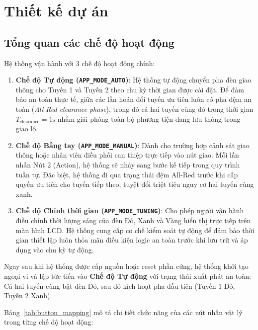 \section{Thiết kế dự án}

\subsection{Tổng quan các chế độ hoạt động}
Hệ thống vận hành với 3 chế độ hoạt động chính:
\begin{enumerate}
    \item \textbf{Chế độ Tự động (\texttt{APP\_MODE\_AUTO})}: Hệ thống tự động chuyển pha đèn giao thông cho Tuyến 1 và Tuyến 2 theo chu kỳ thời gian được cài đặt. Để đảm bảo an toàn thực tế, giữa các lần hoán đổi tuyến ưu tiên luôn có pha đệm an toàn (\textit{All-Red clearance phase}), trong đó cả hai tuyến cùng đỏ trong thời gian $T_{\text{clearance}} = 1\text{s}$ nhằm giải phóng toàn bộ phương tiện đang lưu thông trong giao lộ.
    \item \textbf{Chế độ Bằng tay (\texttt{APP\_MODE\_MANUAL})}: Dành cho trường hợp cảnh sát giao thông hoặc nhân viên điều phối can thiệp trực tiếp vào nút giao. Mỗi lần nhấn Nút 2 (Action), hệ thống sẽ nhảy sang bước kế tiếp trong quy trình tuần tự. Đặc biệt, hệ thống đi qua trạng thái đệm All-Red trước khi cấp quyền ưu tiên cho tuyến tiếp theo, tuyệt đối triệt tiêu nguy cơ hai tuyến cùng xanh.
    \item \textbf{Chế độ Chỉnh thời gian (\texttt{APP\_MODE\_TUNING})}: Cho phép người vận hành điều chỉnh thời lượng sáng của đèn Đỏ, Xanh và Vàng hiển thị trực tiếp trên màn hình LCD. Hệ thống cung cấp cơ chế kiểm soát tự động để đảm bảo thời gian thiết lập luôn thỏa mãn điều kiện logic an toàn trước khi lưu trữ và áp dụng vào chu kỳ tự động.
\end{enumerate}

Ngay sau khi hệ thống được cấp nguồn hoặc reset phần cứng, hệ thống khởi tạo ngoại vi và lập tức tiến vào \textbf{Chế độ Tự động} với trạng thái xuất phát an toàn: Cả hai tuyến cùng bật đèn Đỏ, sau đó kích hoạt pha đầu tiên (Tuyến 1 Đỏ, Tuyến 2 Xanh).

Bảng~\ref{tab:button_mapping} mô tả chi tiết chức năng của các nút nhấn vật lý trong từng chế độ hoạt động:


